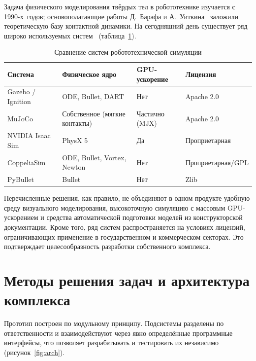 Задача физического моделирования твёрдых тел в робототехнике изучается с
1990-х~годов; основополагающие работы Д.~Барафа и А.~Уиткина~\cite{baraff1997}
заложили теоретическую базу контактной динамики. На сегодняшний день существует
ряд широко используемых систем~\cite{todorov2012mujoco,coumans2021bullet,nvidia_physx,smith2005ode}
(таблица~\ref{tab:engines}).

\begin{table}[ht]
  \centering
  \caption{Сравнение систем робототехнической симуляции}
  \label{tab:engines}
  \small
  \begin{tabular}{p{} p{} p{} p{}}
    \toprule
    Система & Физическое ядро & GPU-ускорение & Лицензия \\
    \midrule
    Gazebo / Ignition & ODE, Bullet, DART & Нет & Apache 2.0 \\
    MuJoCo            & Собственное (мягкие контакты) & Частично (MJX) & Apache 2.0 \\
    NVIDIA Isaac Sim  & PhysX 5 & Да & Проприетарная \\
    CoppeliaSim       & ODE, Bullet, Vortex, Newton & Нет & Проприетарная/\allowbreak GPL \\
    PyBullet          & Bullet & Нет & Zlib \\
    \bottomrule
  \end{tabular}
\end{table}

Перечисленные решения, как правило, не объединяют в одном продукте удобную среду
визуального моделирования, высокоточную симуляцию с массовым GPU-ускорением и
средства автоматической подготовки моделей из конструкторской документации.
Кроме того, ряд систем распространяется на условиях лицензий, ограничивающих
применение в государственном и коммерческом секторах. Это подтверждает
целесообразность разработки собственного комплекса.

\section{Методы решения задач и архитектура комплекса}

Прототип построен по модульному принципу. Подсистемы разделены по
ответственности и взаимодействуют через явно определённые программные
интерфейсы, что позволяет разрабатывать и тестировать их независимо
(рисунок~\ref{fig:arch}).

